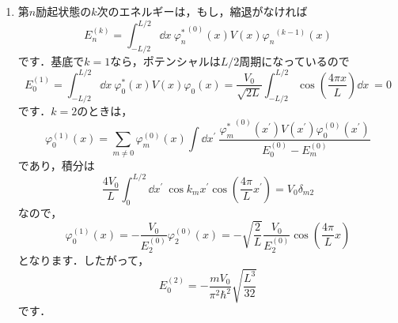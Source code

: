 \documentclass[a4paper,pdflatex,ja=standard]{bxjsarticle}
\begin{document}
\begin{enumerate}
  \item 
  第$n$励起状態の$k$次のエネルギーは，もし，縮退がなければ
  \begin{equation}
    E_n^{(k)}
    =
    \int_{-L/2}^{L/2}
    \dd x\ 
    {\varphi^{*}_{n}}^{(0)}(x)
    V(x)
    {\varphi_n}^{(k-1)}(x)
    \label{fract}
  \end{equation}
  です．基底で$k=1$なら，ポテンシャルは$L/2$周期になっているので
  \begin{equation}
    E_0^{(1)}
    =
    \int_{-L/2}^{L/2}
    \dd x\ 
    {\varphi^{*}_{0}}(x)
    V(x)
    {\varphi_0}(x)
    =
    \frac{V_0}{\sqrt{2L}}
    \int_{-L/2}^{L/2}
    \cos\left( \frac{4\pi x}{L} \right)
    \dd x\     
    =
    0
  \end{equation}
  です．$k=2$のときは，
  \begin{equation}
    \varphi_0^{(1)}(x)
    =
    \sum_{m\neq 0}
    \varphi_m^{(0)}(x)
    \int\dd x^{\prime}\ 
    \frac{{\varphi_m^*}^{(0)}(x^{\prime})V(x^{\prime})\varphi_0^{(0)}(x^{\prime})}{E_0^{(0)}-E_m^{(0)}}
  \end{equation}
  であり，積分は
  \begin{equation}
    \frac{4V_0}{L}
    \int_0^{L/2}\dd x^{\prime}\ 
    \cos k_mx^{\prime}\cos \left( \frac{4\pi}{L}x^{\prime} \right)
    =
    V_0\delta_{m2}
  \end{equation}
  なので，
  \begin{equation}
    \varphi_0^{(1)}(x)
    =
    -
    \frac{V_0}{E_2^{(0)}}\varphi_2^{(0)}(x)
    =
    -
    \sqrt{\frac{2}{L}}\frac{V_0}{E_2^{(0)}}\cos\left( \frac{4\pi}{L}x \right)
  \end{equation}
  となります．したがって，
  \begin{equation}
    E_0^{(2)}
    =
    -
    \frac{mV_0}{\pi^2\hbar^2}\sqrt{\frac{L^3}{32}}
  \end{equation}
  です．


\end{enumerate}
\end{document}

